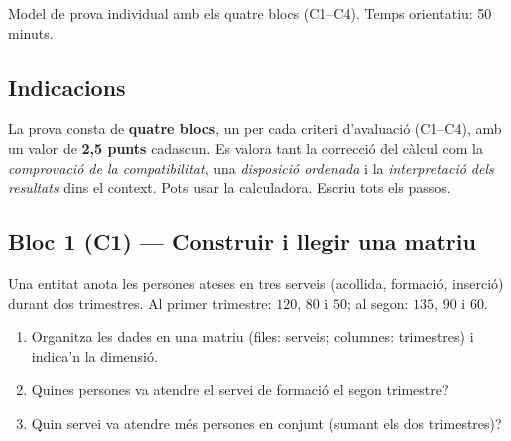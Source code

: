 %
{Model de prova individual amb els quatre blocs (C1–C4). Temps orientatiu: 50 minuts.}

\subsection*{Indicacions}

La prova consta de \textbf{quatre blocs}, un per cada criteri d'avaluació (C1–C4),
amb un valor de \textbf{2,5 punts} cadascun. Es valora tant la correcció del càlcul
com la \emph{comprovació de la compatibilitat}, una \emph{disposició ordenada} i la
\emph{interpretació dels resultats} dins el context. Pots usar la calculadora.
Escriu tots els passos.

\subsection{Bloc 1 (C1) — Construir i llegir una matriu}

\begin{exercicis}
\begin{exlist}
  \item Una entitat anota les persones ateses en tres serveis (acollida, formació,
        inserció) durant dos trimestres. Al primer trimestre: $120$, $80$ i $50$; al
        segon: $135$, $90$ i $60$.
        \begin{enumerate}[label=\alph*), leftmargin=1.6em, topsep=2pt]
          \item Organitza les dades en una matriu (files: serveis; columnes:
                trimestres) i indica'n la dimensió.
          \item Quines persones va atendre el servei de formació el segon trimestre?
          \item Quin servei va atendre més persones en conjunt (sumant els dos
                trimestres)?
        \end{enumerate}
\end{exlist}
\end{exercicis}

